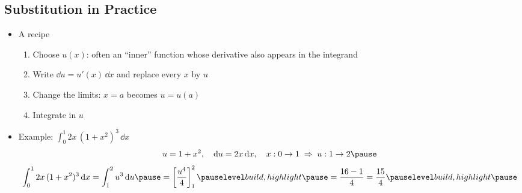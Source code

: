 \begin{slide}
\section[-2]{Substitution in Practice}

\begin{PauseHighLight}
  \begin{itemize}
  \item A recipe
    \begin{enumerate}
    \item Choose $u(x)$: often an ``inner'' function whose derivative
      also appears in the integrand\pause
    \item Write $\dd u = u'(x)\,\dd x$ and replace every $x$ by $u$\pause
    \item Change the limits: $x=a$ becomes $u=u(a)$\pause
    \item Integrate in $u$\pause
    \end{enumerate}
  \item Example: $\displaystyle\int_0^1 2x\,(1+x^2)^3\,\dd x$\pause
    \begin{align*}
      u = 1+x^2, \quad \dd u = 2x\,\dd x, \quad
      x: 0\to1 \;\Rightarrow\; u: 1\to2\pause
    \end{align*}
    \begin{align*}
      \int_0^1 2x\,(1+x^2)^3\,\dd x = \int_1^2 u^3\,\dd u\pause
      = \left[\frac{u^4}{4}\right]_1^2 \pauseb= \frac{16-1}{4} = \frac{15}{4}\pauseb
    \end{align*}
  \end{itemize}
\end{PauseHighLight}

\end{slide}


